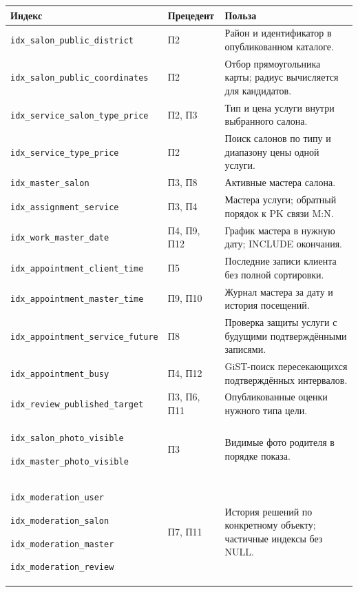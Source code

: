 \documentclass[11pt,a4paper]{article}
\begin{document}
\begin{longtable}{L{6.4cm}L{2.0cm}L{7.3cm}}
\toprule Индекс & Прецедент & Польза\\\midrule\endhead
\texttt{idx\_\allowbreak{}salon\_\allowbreak{}public\_\allowbreak{}district} & П2 & Район и идентификатор в опубликованном каталоге.\\
\texttt{idx\_\allowbreak{}salon\_\allowbreak{}public\_\allowbreak{}coordinates} & П2 & Отбор прямоугольника карты; радиус вычисляется для кандидатов.\\
\texttt{idx\_\allowbreak{}service\_\allowbreak{}salon\_\allowbreak{}type\_\allowbreak{}price} & П2, П3 & Тип и цена услуги внутри выбранного салона.\\
\texttt{idx\_\allowbreak{}service\_\allowbreak{}type\_\allowbreak{}price} & П2 & Поиск салонов по типу и диапазону цены одной услуги.\\
\texttt{idx\_\allowbreak{}master\_\allowbreak{}salon} & П3, П8 & Активные мастера салона.\\
\texttt{idx\_\allowbreak{}assignment\_\allowbreak{}service} & П3, П4 & Мастера услуги; обратный порядок к PK связи M:N.\\
\texttt{idx\_\allowbreak{}work\_\allowbreak{}master\_\allowbreak{}date} & П4, П9, П12 & График мастера в нужную дату; INCLUDE окончания.\\
\texttt{idx\_\allowbreak{}appointment\_\allowbreak{}client\_\allowbreak{}time} & П5 & Последние записи клиента без полной сортировки.\\
\texttt{idx\_\allowbreak{}appointment\_\allowbreak{}master\_\allowbreak{}time} & П9, П10 & Журнал мастера за дату и история посещений.\\
\texttt{idx\_\allowbreak{}appointment\_\allowbreak{}service\_\allowbreak{}future} & П8 & Проверка защиты услуги с будущими подтверждёнными записями.\\
\texttt{idx\_\allowbreak{}appointment\_\allowbreak{}busy} & П4, П12 & GiST-поиск пересекающихся подтверждённых интервалов.\\
\texttt{idx\_\allowbreak{}review\_\allowbreak{}published\_\allowbreak{}target} & П3, П6, П11 & Опубликованные оценки нужного типа цели.\\
\texttt{idx\_\allowbreak{}salon\_\allowbreak{}photo\_\allowbreak{}visible}\par \texttt{idx\_\allowbreak{}master\_\allowbreak{}photo\_\allowbreak{}visible} & П3 & Видимые фото родителя в порядке показа.\\
\texttt{idx\_\allowbreak{}moderation\_\allowbreak{}user}\par \texttt{idx\_\allowbreak{}moderation\_\allowbreak{}salon}\par \texttt{idx\_\allowbreak{}moderation\_\allowbreak{}master}\par \texttt{idx\_\allowbreak{}moderation\_\allowbreak{}review} & П7, П11 & История решений по конкретному объекту; частичные индексы без NULL.\\

\end{longtable}
\end{document}

